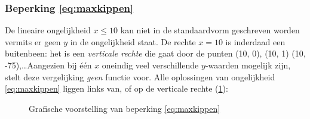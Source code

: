 \subsubsection{Beperking \eqref{eq:maxkippen}}
De lineaire ongelijkheid $x \leqslant 10$ kan niet in de standaardvorm
geschreven worden vermits er geen $y$ in de ongelijkheid staat.
De rechte  $x=10$ is inderdaad een buitenbeen:
het is een \emph{verticale rechte} die gaat door de punten (10,
0), (10, 1) (10, -75),\ldots Aangezien bij \'{e}\'{e}n $x$ oneindig
veel verschillende $y$-waarden mogelijk zijn, stelt deze vergelijking
\emph{geen} functie voor. Alle oplossingen van ongelijkheid \eqref{eq:maxkippen} liggen links van, of op
de verticale rechte (\cref{fig:vertrechte}):
\begin{figure}[htbp]
    \centering
{}
    \caption{Grafische voorstelling van beperking \eqref{eq:maxkippen}}
    \label{fig:vertrechte}
\end{figure}



